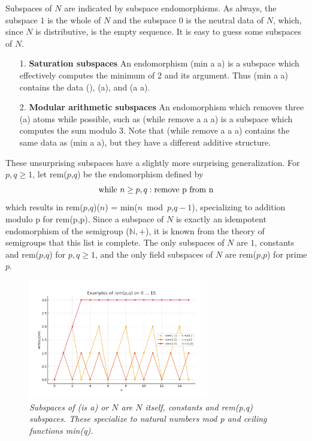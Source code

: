 \documentclass[11pt]{article}
\begin{document}
    Subspaces of $N$ are indicated by subspace endomorphisms.  As always, the subspace $1$ is the whole of $N$ and the subspace $0$ is the neutral data of $N$, which, 
since $N$ is distributive, is the empty sequence.  It is easy to guess some subspaces of $N$.
\begin{itemize} 
\item [1.] {\bf Saturation subspaces} An endomorphism (min a a) is a subspace which effectively computes the minimum of 2 and its argument.  Thus (min a a) contains the data (), (a), and (a a). 
\item [2.] {\bf Modular arithmetic subspaces} An endomorphism which removes three (a) atoms while possible, such as (while remove a a a) is a subspace which computes the sum modulo 3.  Note 
that (while remove a a a) contains the same data as (min a a), but they have a different additive structure.  
\end{itemize}
These unsurprising subspaces have a slightly more surprising generalization.  For $p,q\ge 1$, let rem($p$,$q$) be the endomorphism defined by 
\begin{equation}
{\rm while}\ n\ge p,q: {\rm remove\ p\ from\ n}
\end{equation}
which results in rem($p$,$q$)($n$) = min($n$\ mod\ $p$,$q-1$), specializing to addition modulo p for rem(p,p).  Since a subspace of $N$ is exactly an idempotent 
endomorphism of the semigroup (${\mathbb N},+$), it is known from the theory of semigroups that this list is complete\cite{semigroup}.  The only subspaces of $N$ are $1$, constants and rem($p$,$q$) for $p,q\ge 1$, and the only field subspaces of $N$ are rem($p$,$p$) for prime $p$. 

\begin{figure}[h]
\centering
\includegraphics[width=0.7\textwidth]{rem.png}
\caption{{\it Subspaces of (is a) or $N$ are $N$ itself, constants and rem(p,q) subspaces.  These specialize to natural numbers mod p and ceiling functions min(q).}}
\end{figure}
\end{document}
